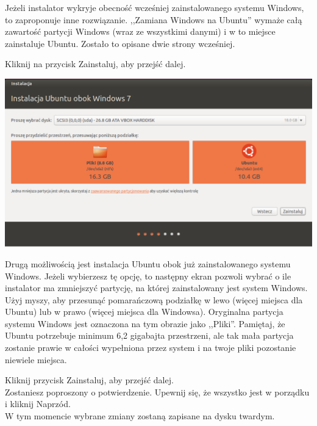 Jeżeli instalator wykryje obecność wcześniej zainstalowanego systemu Windows, to zaproponuje inne rozwiązanie. ,,Zamiana Windows na Ubuntu'' wymaże całą zawartość partycji Windows (wraz ze wszystkimi danymi) i w to miejsce zainstaluje Ubuntu. Zostało to opisane dwie strony wcześniej.
\begin{flushright}
Kliknij na przycisk \textcolor{ubuntu_orange}{Zainstaluj}, aby przejść dalej.
\end{flushright}
\clearpage
\begin{center}
        \includegraphics[width=\linewidth]{images/instalator_partycjonowanie_obok_wondows7_2.png}
\end{center}

Drugą możliwością jest instalacja Ubuntu obok już zainstalowanego systemu Windows. Jeżeli wybierzesz tę opcję, to następny ekran pozwoli wybrać o ile instalator ma zmniejszyć partycję, na której zainstalowany jest system Windows. Użyj myszy, aby przesunąć pomarańczową podziałkę w lewo (więcej miejsca dla Ubuntu) lub w prawo (więcej miejsca dla Windowsa). Oryginalna partycja systemu Windows jest oznaczona na tym obrazie jako ,,Pliki''. Pamiętaj, że Ubuntu potrzebuje minimum 6,2 gigabajta przestrzeni, ale tak mała partycja zostanie prawie w całości wypełniona przez system i na twoje pliki pozostanie niewiele miejsca.
\begin{flushright}
Kliknij przycisk \textcolor{ubuntu_orange}{Zainstaluj}, aby przejść dalej.\\
Zostaniesz poproszony o potwierdzenie. Upewnij się, że wszystko jest w porządku i kliknij \textcolor{ubuntu_orange}{Naprzód}.\\
W tym momencie wybrane zmiany zostaną zapisane na dysku twardym.
\end{flushright}
\clearpage
